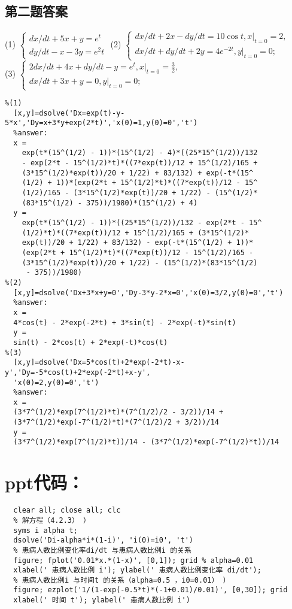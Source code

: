 \documentclass[oneside]{ctexart}
\begin{document}
\subsection{第二题答案}
\noindent (1)
$\begin{cases}
dx/dt+5x+y=e^t\\
dy/dt-x-3y=e^2t
\end{cases}$
(2)
$\begin{cases}
dx/dt+2x-dy/dt=10\cos t,x|_{t=0}=2,\\
dx/dt+dy/dt+2y=4e^{-2t},y|_{t=0}=0;
\end{cases}$\\
(3)
$\begin{cases}
2dx/dt+4x+dy/dt-y=e^t,x|_{t=0}=\frac{3}{2},\\
dx/dt+3x+y=0,y|_{t=0}=0;
\end{cases}$
\begin{lstlisting}
%(1)
  [x,y]=dsolve('Dx=exp(t)-y-5*x','Dy=x+3*y+exp(2*t)','x(0)=1,y(0)=0','t')
  %answer:
  x =
    exp(t*(15^(1/2) - 1))*(15^(1/2) - 4)*((25*15^(1/2))/132 
    - exp(2*t - 15^(1/2)*t)*((7*exp(t))/12 + 15^(1/2)/165 +
    (3*15^(1/2)*exp(t))/20 + 1/22) + 83/132) + exp(-t*(15^
    (1/2) + 1))*(exp(2*t + 15^(1/2)*t)*((7*exp(t))/12 - 15^
    (1/2)/165 - (3*15^(1/2)*exp(t))/20 + 1/22) - (15^(1/2)*
    (83*15^(1/2) - 375))/1980)*(15^(1/2) + 4)
  y =
    exp(t*(15^(1/2) - 1))*((25*15^(1/2))/132 - exp(2*t - 15^
    (1/2)*t)*((7*exp(t))/12 + 15^(1/2)/165 + (3*15^(1/2)*
    exp(t))/20 + 1/22) + 83/132) - exp(-t*(15^(1/2) + 1))*
    (exp(2*t + 15^(1/2)*t)*((7*exp(t))/12 - 15^(1/2)/165 - 
    (3*15^(1/2)*exp(t))/20 + 1/22) - (15^(1/2)*(83*15^(1/2)
     - 375))/1980)
%(2)
  [x,y]=dsolve('Dx+3*x+y=0','Dy-3*y-2*x=0','x(0)=3/2,y(0)=0','t')
  %answer:
  x =
  4*cos(t) - 2*exp(-2*t) + 3*sin(t) - 2*exp(-t)*sin(t)
  y =
  sin(t) - 2*cos(t) + 2*exp(-t)*cos(t)
%(3)
  [x,y]=dsolve('Dx=5*cos(t)+2*exp(-2*t)-x-y','Dy=-5*cos(t)+2*exp(-2*t)+x-y',
  'x(0)=2,y(0)=0','t')
  %answer:
  x =
  (3*7^(1/2)*exp(7^(1/2)*t)*(7^(1/2)/2 - 3/2))/14 +
  (3*7^(1/2)*exp(-7^(1/2)*t)*(7^(1/2)/2 + 3/2))/14
  y =
  (3*7^(1/2)*exp(7^(1/2)*t))/14 - (3*7^(1/2)*exp(-7^(1/2)*t))/14
\end{lstlisting}
\section{ppt代码：}
\begin{lstlisting}
  clear all; close all; clc
  % 解方程（4.2.3） ）
  syms i alpha t;
  dsolve('Di-alpha*i*(1-i)', 'i(0)=i0', 't')
  % 患病人数比例变化率di/dt 与患病人数比例i 的关系
  figure; fplot('0.01*x.*(1-x)', [0,1]); grid % alpha=0.01
  xlabel(' 患病人数比例 i'); ylabel(' 患病人数比例变化率 di/dt');
  % 患病人数比例i 与时间t 的关系（alpha=0.5 ，i0=0.01） ）
  figure; ezplot('1/(1-exp(-0.5*t)*(-1+0.01)/0.01)', [0,30]); grid
  xlabel(' 时间 t'); ylabel(' 患病人数比例 i')
\end{lstlisting}
\end{document}
